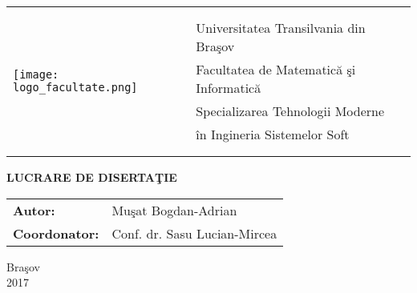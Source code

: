 \begin{titlepage}
	\begin{center}
		\vspace*{-2cm}

		\Large
		\begin{tabular}{ll}
			\multirow{8}{*}{\texttt{[image: logo\_facultate.png]}}
			&\\
			&\\
			&Universitatea Transilvania din Bra\c sov\\
			&Facultatea de Matematic\u a \c si Informatic\u a\\
			&Specializarea Tehnologii Moderne \\
			& \^ in Ingineria Sistemelor Soft\\
			&\\
			&\\
		\end{tabular}

		\vspace{1.5cm}
					
		\Huge
		\textbf{LUCRARE DE DISERTA\c TIE}
		
		\vspace{8cm}
				
		\Large
		\begin{tabular}{ll}
			\textbf{Autor:}&Mu\c sat Bogdan-Adrian\\
			\textbf{Coordonator:}&Conf. dr. Sasu Lucian-Mircea
		\end{tabular}
		
		\vfill
		
		\Large
		Bra\c sov\\
		2017
        
	\end{center}
\end{titlepage}